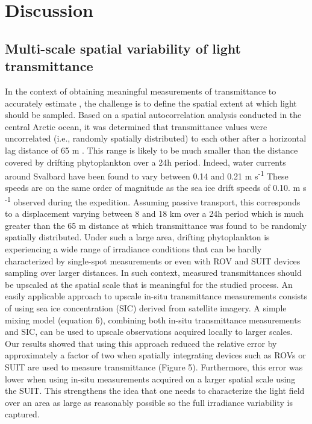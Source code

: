 \section{Discussion}

\subsection{Multi-scale spatial variability of light transmittance}

In the context of obtaining meaningful measurements of transmittance to accurately estimate \eparzerosmoins{}, the challenge is to define the spatial extent at which light should be sampled. Based on a spatial autocorrelation analysis conducted in the central Arctic ocean, it was determined that transmittance values were uncorrelated (i.e., randomly spatially distributed) to each other after a horizontal lag distance of 65 m \citep{Lange2017b}. This range is likely to be much smaller than the distance covered by drifting phytoplankton over a 24h period. Indeed, water currents around Svalbard have been found to vary between 0.14 and 0.21 m s\textsuperscript{-1} \citep{Meyer2017} These speeds are on the same order of magnitude as the sea ice drift speeds of 0.10. m s \textsuperscript{-1} observed during the expedition. Assuming passive transport, this corresponds to a displacement varying between 8 and 18 km over a 24h period which is much greater than the 65 m distance at which transmittance was found to be randomly spatially distributed. Under such a large area, drifting phytoplankton is experiencing a wide range of irradiance conditions that can be hardly characterized by single-spot measurements or even with ROV and SUIT devices sampling over larger distances. In such context, measured transmittances should be upscaled at the spatial scale that is meaningful for the studied process. An easily applicable approach to upscale in-situ transmittance measurements consists of using sea ice concentration (SIC) derived from satellite imagery. A simple mixing model (equation 6), combining both in-situ transmittance measurements and SIC, can be used to upscale observations acquired locally to larger scales. Our results showed that using this approach reduced the relative error by approximately a factor of two when spatially integrating devices such as ROVs or SUIT are used to measure transmittance (Figure 5). Furthermore, this error was lower when using in-situ measurements acquired on a larger spatial scale using the SUIT. This strengthens the idea that one needs to characterize the light field over an area as large as reasonably possible so the full irradiance variability is captured.

